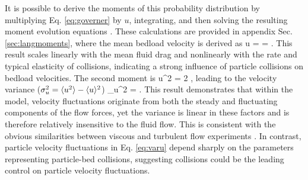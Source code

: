 It is possible to derive the moments of this probability distribution by multiplying Eq. \ref{eq:governer} by $u$, integrating, and then solving the resulting moment evolution equations \citep[cf.][]{Cox1965}.
These calculations are provided in appendix Sec. \ref{sec:langmoments}, where the mean bedload velocity is derived as
\be \langle u \rangle =  = . \label{eq:meanu}\ee
This result scales linearly with the mean fluid drag and nonlinearly with the rate and typical elasticity of collisions, indicating a strong influence of particle collisions on bedload velocities.
The second moment is
\be \langle u^2 \rangle = 2 , \ee
leading to the velocity variance ($\sigma_u^2 = \langle u^2 \rangle - \langle u \rangle ^2 $)
\be \sigma_u^2 = . \label{eq:varu}\ee
This result demonstrates that within the model, velocity fluctuations originate from both the steady and fluctuating components of the flow forces, yet the variance is linear in these factors and is therefore relatively insensitive to the fluid flow.
This is consistent with the obvious similarities between viscous and turbulent flow experiments \citep[e.g.][]{Charru2004,Lajeunesse2010}.
In contrast, particle velocity fluctuations in Eq. \ref{eq:varu} depend sharply on the parameters representing particle-bed collisions, suggesting collisions could be the leading control on particle velocity fluctuations.

